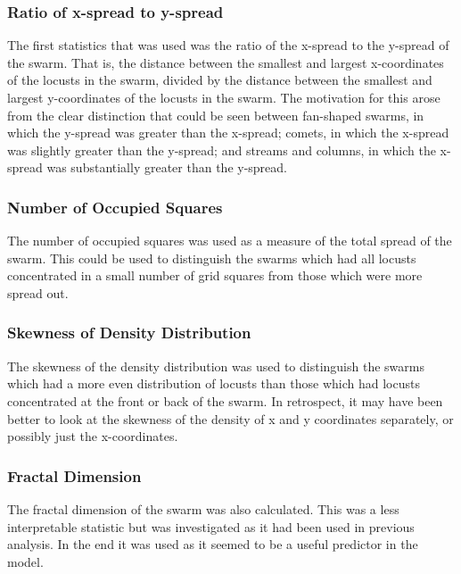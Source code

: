 \documentclass[a4paper]{article}
\begin{document}
\subsubsection{Ratio of x-spread to y-spread}

The first statistics that was used was the ratio of the x-spread to the y-spread of the swarm. That is, the distance between the smallest and largest x-coordinates of the locusts in the swarm, divided by the distance between the smallest and largest y-coordinates of the locusts in the swarm. The motivation for this arose from the clear distinction that could be seen between fan-shaped swarms, in which the y-spread was greater than the x-spread; comets, in which the x-spread was slightly greater than the y-spread; and streams and columns, in which the x-spread was substantially greater than the y-spread.

\subsubsection{Number of Occupied Squares}

The number of occupied squares was used as a measure of the total spread of the swarm. This could be used to distinguish the swarms which had all locusts concentrated in a small number of grid squares from those which were more spread out.

\subsubsection{Skewness of Density Distribution}

The skewness of the density distribution was used to distinguish the swarms which had a more even distribution of locusts than those which had locusts concentrated at the front or back of the swarm. In retrospect, it may have been better to look at the skewness of the density of x and y coordinates separately, or possibly just the x-coordinates.

\subsubsection{Fractal Dimension}

The fractal dimension of the swarm was also calculated. This was a less interpretable statistic but was investigated as it had been used in previous analysis. In the end it was used as it seemed to be a useful predictor in the model. 


{\color{red}{Show some plots of two statistics against one another coloured by class.}}
\end{document}
